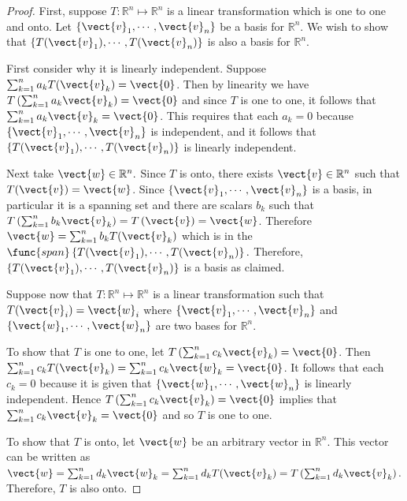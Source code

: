 \begin{proof}
First, suppose $T:\mathbb{R}^n \mapsto \mathbb{R}^n$ is a linear
transformation which is one to one and onto. Let $\left\{
\vect{v}_{1},\cdots ,\vect{v}_{n}\right\} $ be a basis for
$\mathbb{R}^n$. We wish to show that $\left\{ T(\vect{v}_{1}),\cdots ,
T(\vect{v}_{n})\right\} $ is also a basis for $\mathbb{R}^n$. 

First consider why it is linearly independent. Suppose
$\sum_{k=1}^{n}a_{k}T(\vect{v}_{k})=\vect{0}$. Then by linearity we have $T\left(
\sum_{k=1}^{n}a_{k}\vect{v}_{k}\right) =\vect{0}$ and since $T$ is one
to one, it follows that $\sum_{k=1}^{n}a_{k}\vect{v}_{k}=\vect{0}$.
This requires that  each $a_{k}=0$ because $\left\{ \vect{v}_{1},\cdots,
\vect{v}_{n}\right\} $ is independent, and it follows that $\left\{
T(\vect{v}_{1}),\cdots , T(\vect{v}_{n})\right\} $ is linearly
independent. 

Next take $\vect{w}\in \mathbb{R}^n.$ Since $T$ is onto,
there exists $\vect{v}\in \mathbb{R}^n$ such that
$T(\vect{v})=\vect{w}$. Since $ \left\{ \vect{v}_{1},\cdots
,\vect{v}_{n}\right\} $ is a basis, in particular it is a spanning set
and there are scalars $b_{k}$ such that $T\left(
\sum_{k=1}^{n}b_{k}\vect{v} _{k}\right) =T\left( \vect{v}\right)
=\vect{w}$. Therefore $\vect{w} =\sum_{k=1}^{n}b_{k}T(\vect{v}_{k})$
which is in the $\func{span}\left\{ T(\vect{v}_{1}),\cdots ,
T(\vect{v}_{n})\right\} .$ Therefore, $\left\{ T(\vect{v}_{1}),\cdots
,T(\vect{v}_{n}) \right\} $ is a basis as claimed.

Suppose now that $T: \mathbb{R}^n \mapsto \mathbb{R}^n$ is a linear
transformation such that $T(\vect{v}_{i})=\vect{w}_{i}$ where
$\left\{\vect{v} _{1},\cdots ,\vect{v}_{n}\right\} $ and $\left\{
\vect{w}_{1},\cdots , \vect{w}_{n}\right\} $ are two bases for
$\mathbb{R}^n$. 

To show that $T$ is one to one, let $T\left(
\sum_{k=1}^{n}c_{k}\vect{v}_{k}\right) =\vect{0}$. Then
$\sum_{k=1}^{n}c_{k}T(\vect{v}_{k})=\sum_{k=1}^{n}c_{k}\vect{w}_{k}=\vect{
0}$. It follows that each $c_{k} = 0$ because it is given that
$\left\{ \vect{w} _{1},\cdots ,\vect{w}_{n}\right\} $ is linearly
independent. Hence $T\left( \sum_{k=1}^{n}c_{k}\vect{v}_{k}\right)
=\vect{0}$ implies that $\sum_{k=1}^{n}c_{k}\vect{v}_{k}=\vect{0}$ and
so $T$ is one to one.  

To show that $T$ is onto, let $\vect{w}$ be an arbitrary vector in
$\mathbb{R}^n$. This vector can be written as $\vect{w} =
\sum_{k=1}^{n}d_k\vect{w}_k =
\sum_{k=1}^{n}d_{k}T(\vect{v}_{k})=T\left( \sum_{k=1}^{n}d_{k}
\vect{v}_{k}\right) .$  Therefore, $T$ is also onto. 
\end{proof}

